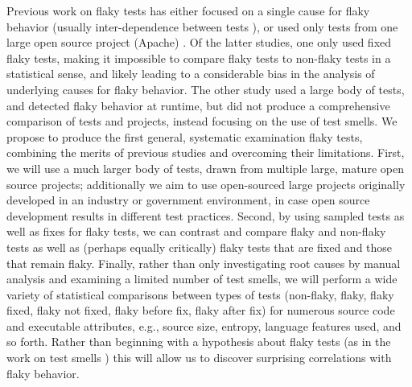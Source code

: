 \documentclass[10pt]{article}
\begin{document}
 Previous work on flaky tests has either focused on a single cause for flaky behavior (usually inter-dependence between tests \cite{LamZE2015}), or used only tests from one large open source project (Apache) \cite{luo2014empirical,palomba2017does}.  Of the latter studies, one \cite{luo2014empirical} only used fixed flaky tests, making it impossible to compare flaky tests to non-flaky tests in a statistical sense, and likely leading to a considerable bias in the analysis of underlying causes for flaky behavior.  The other study \cite{palomba2017does} used a large body of tests, and detected flaky behavior at runtime, but did not produce a comprehensive comparison of tests and projects, instead focusing on the use of test smells.  We propose to produce the first general, systematic examination flaky tests, combining the merits of previous studies and overcoming their limitations.  First, we will use a much larger body of tests, drawn from multiple large, mature open source projects; additionally we aim to use open-sourced large projects originally developed in an industry or government environment, in case open source development results in different test practices.  Second, by using sampled tests as well as fixes for flaky tests, we can contrast and compare flaky and non-flaky tests as well as (perhaps equally critically) flaky tests that are fixed and those that remain flaky.  Finally, rather than only investigating root causes by manual analysis and examining a limited number of test smells, we will perform a wide variety of statistical comparisons between types of tests (non-flaky, flaky, flaky fixed, flaky not fixed, flaky before fix, flaky after fix) for numerous source code and executable attributes, e.g., source size, entropy, language features used, and so forth.  Rather than beginning with a hypothesis about flaky tests (as in the work on test smells \cite{palomba2017does}) this will allow us to discover surprising correlations with flaky behavior.
\end{document}
